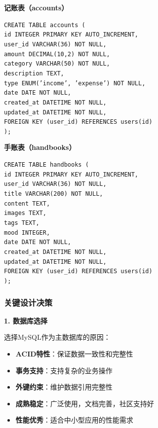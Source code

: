 \documentclass[a4paper]{article}
\begin{document}
\textbf{记账表（accounts）}

\texttt{CREATE TABLE accounts (}\\
\texttt{id INTEGER PRIMARY KEY AUTO\_INCREMENT,}\\
\texttt{user\_id VARCHAR(36) NOT NULL,}\\
\texttt{amount DECIMAL(10,2) NOT NULL,}\\
\texttt{category VARCHAR(50) NOT NULL,}\\
\texttt{description TEXT,}\\
\texttt{type ENUM('income', 'expense') NOT NULL,}\\
\texttt{date DATE NOT NULL,}\\
\texttt{created\_at DATETIME NOT NULL,}\\
\texttt{updated\_at DATETIME NOT NULL,}\\
\texttt{FOREIGN KEY (user\_id) REFERENCES users(id)}\\
\texttt{);}

\textbf{手账表（handbooks）}

\texttt{CREATE TABLE handbooks (}\\
\texttt{id INTEGER PRIMARY KEY AUTO\_INCREMENT,}\\
\texttt{user\_id VARCHAR(36) NOT NULL,}\\
\texttt{title VARCHAR(200) NOT NULL,}\\
\texttt{content TEXT,}\\
\texttt{images TEXT,}\\
\texttt{tags TEXT,}\\
\texttt{mood INTEGER,}\\
\texttt{date DATE NOT NULL,}\\
\texttt{created\_at DATETIME NOT NULL,}\\
\texttt{updated\_at DATETIME NOT NULL,}\\
\texttt{FOREIGN KEY (user\_id) REFERENCES users(id)}\\
\texttt{);}

\subsubsection{关键设计决策}

\textbf{1. 数据库选择}

选择MySQL作为主数据库的原因：

\begin{itemize}
    \item \textbf{ACID特性}：保证数据一致性和完整性
    \item \textbf{事务支持}：支持复杂的业务操作
    \item \textbf{外键约束}：维护数据引用完整性
    \item \textbf{成熟稳定}：广泛使用，文档完善，社区支持好
    \item \textbf{性能优秀}：适合中小型应用的性能需求
\end{itemize}
\end{document}

